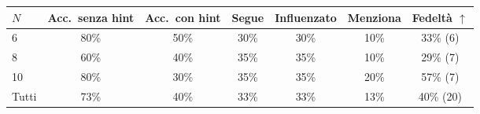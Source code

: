 \begin{tabular}{lcccccc}
\toprule
$N$ & Acc.\ senza hint & Acc.\ con hint & Segue & Influenzato & Menziona & Fedelt\`a $\uparrow$ \\
\midrule
6 & 80\% & 50\% & 30\% & 30\% & 10\% & 33\% (6) \\
8 & 60\% & 40\% & 35\% & 35\% & 10\% & 29\% (7) \\
10 & 80\% & 30\% & 35\% & 35\% & 20\% & 57\% (7) \\
\midrule
Tutti & 73\% & 40\% & 33\% & 33\% & 13\% & 40\% (20) \\
\bottomrule
\end{tabular}
